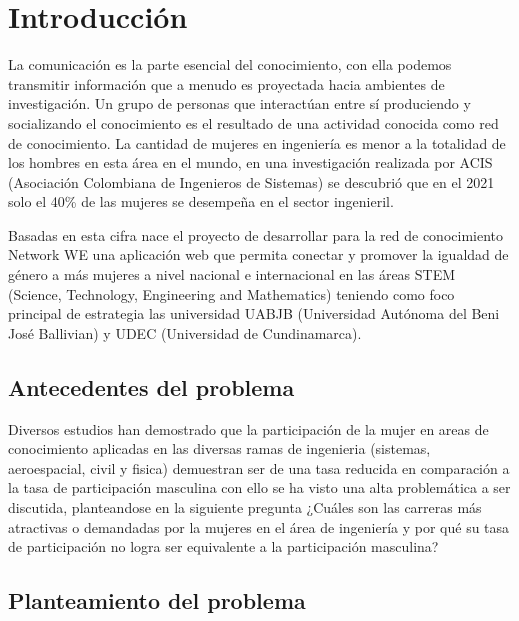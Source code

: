 \documentclass[hidelinks]{Documento}
\begin{document}
\tableofcontents
{}
{\noskip\listoffigures} 
{\noskip\listoftables} 


\mainmatter

\selectfont

\chapter{Introducción}

La comunicación es la parte esencial del conocimiento, con ella podemos transmitir información que a menudo es proyectada hacia ambientes de investigación. Un grupo de personas que interactúan entre sí produciendo y socializando el conocimiento es el resultado de una actividad conocida como red de conocimiento.  La cantidad de mujeres en ingeniería es menor a la totalidad de los hombres en esta área en el mundo, en una investigación realizada por ACIS (Asociación Colombiana de Ingenieros de Sistemas) se descubrió que en el 2021 solo el 40\% de las mujeres se desempeña en el sector ingenieril. 

Basadas en esta cifra nace el proyecto de desarrollar para la red de conocimiento Network WE una aplicación web que permita conectar y promover la igualdad de género a más mujeres a nivel nacional e internacional en las áreas STEM (Science, Technology, Engineering and Mathematics) teniendo como foco principal de estrategia las universidad UABJB (Universidad Autónoma del Beni José Ballivian) y UDEC (Universidad de Cundinamarca).

\section{Antecedentes del problema}

Diversos estudios han demostrado que la participación de la mujer en areas de conocimiento aplicadas en las diversas ramas de ingenieria (sistemas, aeroespacial, civil y fisica) demuestran ser de una tasa reducida en comparación a la tasa de participación masculina \cite{RazoGodinez2008} con ello se ha visto una alta problemática a ser discutida, planteandose en la siguiente pregunta ¿Cuáles son las carreras más atractivas o demandadas por la mujeres en el área de ingeniería y por qué su tasa de participación no logra ser equivalente a la participación masculina?

\section{Planteamiento del problema}
\end{document}
